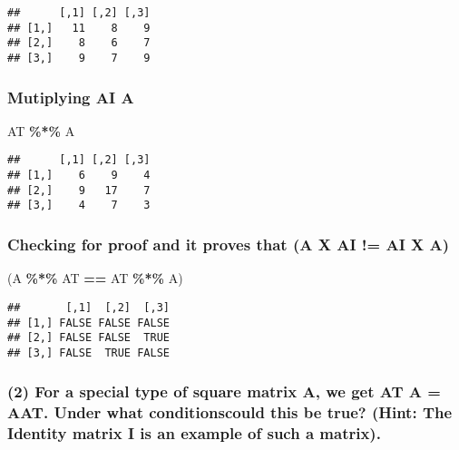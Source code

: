 \documentclass[
]{article}
\newenvironment{Shaded}{\begin{snugshade}}{\end{snugshade}}
\newcommand{\NormalTok}[1]{#1}
\newcommand{\SpecialCharTok}[1]{\textcolor[rgb]{0.81,0.36,0.00}{\textbf{#1}}}
\begin{document}
\begin{verbatim}
##      [,1] [,2] [,3]
## [1,]   11    8    9
## [2,]    8    6    7
## [3,]    9    7    9
\end{verbatim}

\hypertarget{mutiplying-ai-a}{%
\subsubsection{Mutiplying AI A}\label{mutiplying-ai-a}}

\begin{Shaded}
\begin{Highlighting}[]
\NormalTok{AT }\SpecialCharTok{\%*\%}\NormalTok{ A}
\end{Highlighting}
\end{Shaded}

\begin{verbatim}
##      [,1] [,2] [,3]
## [1,]    6    9    4
## [2,]    9   17    7
## [3,]    4    7    3
\end{verbatim}

\hypertarget{checking-for-proof-and-it-proves-that-a-x-ai-ai-x-a}{%
\subsubsection{Checking for proof and it proves that (A X AI != AI X
A)}\label{checking-for-proof-and-it-proves-that-a-x-ai-ai-x-a}}

\begin{Shaded}
\begin{Highlighting}[]
\NormalTok{(A }\SpecialCharTok{\%*\%}\NormalTok{ AT }\SpecialCharTok{==}\NormalTok{ AT }\SpecialCharTok{\%*\%}\NormalTok{ A)}
\end{Highlighting}
\end{Shaded}

\begin{verbatim}
##       [,1]  [,2]  [,3]
## [1,] FALSE FALSE FALSE
## [2,] FALSE FALSE  TRUE
## [3,] FALSE  TRUE FALSE
\end{verbatim}

\hypertarget{for-a-special-type-of-square-matrix-a-we-get-at-a-aat.-under-what-conditionscould-this-be-true-hint-the-identity-matrix-i-is-an-example-of-such-a-matrix.}{%
\subsubsection{(2) For a special type of square matrix A, we get AT A =
AAT. Under what conditionscould this be true? (Hint: The Identity matrix
I is an example of such a
matrix).}\label{for-a-special-type-of-square-matrix-a-we-get-at-a-aat.-under-what-conditionscould-this-be-true-hint-the-identity-matrix-i-is-an-example-of-such-a-matrix.}}
\end{document}
